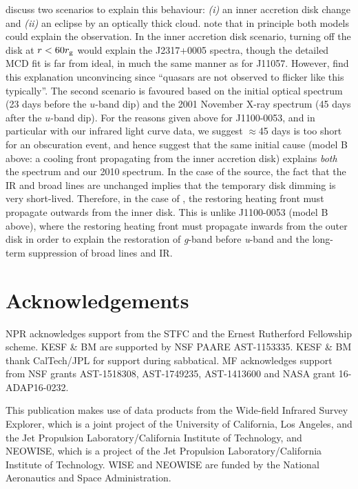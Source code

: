 \documentclass[11pt,a4paper]{article}
\begin{document}
\citet{Guo2016} discuss two scenarios to explain this behaviour: {\it
(i)} an inner accretion disk change and {\it (ii)} an eclipse by an
optically thick cloud. \citet{Guo2016} note that in principle both
models could explain the observation. In the inner accretion disk
scenario, turning off the disk at $r < 60 r_{\rm g}$ would explain the
J2317+0005 spectra, though the detailed MCD fit is far from ideal, in
much the same manner as for J11057. However, \citet{Guo2016} find this
explanation unconvincing since ``quasars are not observed to flicker
like this typically''.  The second scenario is favoured based on the
initial optical spectrum (23 days before the $u$-band dip) and the
2001 November X-ray spectrum (45 days after the $u$-band dip).  For
the reasons given above for J1100-0053, and in particular with our
infrared light curve data, we suggest $\approx$45 days is too short
for an obscuration event, and hence suggest that the same initial
cause (model B above: a cooling front propagating from the inner
accretion disk) explains \emph{both} the \citet{Guo2016} spectrum and
our 2010 spectrum. In the case of the \citet{Guo2016} source, the fact
that the IR and broad lines are unchanged implies that the temporary
disk dimming is very short-lived. Therefore, in the case of
\citet{Guo2016}, the restoring heating front must propagate outwards
from the inner disk. This is unlike J1100-0053 (model B above), where the
restoring heating front must propagate inwards from the outer disk in
order to explain the restoration of {\it g}-band before {\it u}-band
and the long-term suppression of broad lines and IR.


\section*{Acknowledgements}
NPR acknowledges support from the STFC and the Ernest Rutherford
Fellowship scheme.  KESF \& BM are supported by NSF PAARE
AST-1153335. KESF \& BM thank CalTech/JPL for support during
sabbatical.  MF acknowledges support from NSF grants AST-1518308,
AST-1749235, AST-1413600 and NASA grant 16-ADAP16-0232.

This publication makes use of data products from the Wide-field
Infrared Survey Explorer, which is a joint project of the University
of California, Los Angeles, and the Jet Propulsion
Laboratory/California Institute of Technology, and NEOWISE, which is a
project of the Jet Propulsion Laboratory/California Institute of
Technology. WISE and NEOWISE are funded by the National Aeronautics
and Space Administration.
\end{document}
